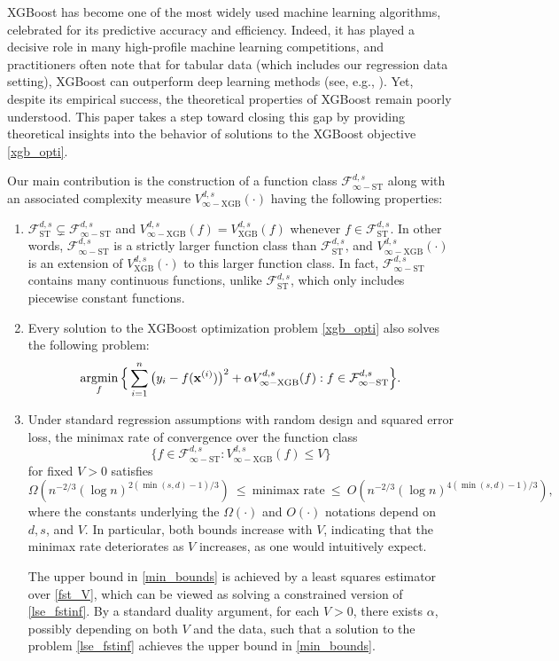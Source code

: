 \documentclass[10pt]{article}
\newcommand{\fst}{{\mathcal{F}^{d, s}_{\text{ST}}}}
\newcommand{\fstinf}{{\mathcal{F}^{d, s}_{\infty-\text{ST}}}}
\newcommand{\vxgb}{{V^{d, s}_{\text{XGB}}}}
\newcommand{\vinfxgb}{{V^{d, s}_{\infty-\text{XGB}}}}
\newcommand{\xbf}{{\mathbf{x}}}
\def\argmin{\mathop{\rm argmin}}
\begin{document}
XGBoost has become one of the most widely used machine learning
algorithms, celebrated for its predictive accuracy and efficiency. 
Indeed, it has played a decisive role in many high-profile machine 
learning competitions, and practitioners often note that for tabular 
data (which includes our regression data setting), XGBoost can 
outperform deep learning methods (see, e.g., 
\citet{shwartz2022tabular, grinsztajn2022tree, borisov2022deep}). 
Yet, despite its empirical success, the theoretical properties of 
XGBoost remain poorly understood. This paper takes a step toward 
closing this gap by providing theoretical insights into the behavior 
of solutions to the XGBoost objective \eqref{xgb_opti}.

Our main contribution is the construction of a function class
$\fstinf$ along with an associated complexity measure
$\vinfxgb(\cdot)$ having the following properties:
\begin{enumerate}
\item $\fst \subsetneq \fstinf$ and $\vinfxgb(f) = \vxgb(f)$ whenever
  $f \in \fst$. In other words, $\fstinf$ is a strictly larger 
  function class than $\fst$, and $\vinfxgb(\cdot)$ is an 
  extension of $\vxgb(\cdot)$ to this larger function class. In fact, 
  $\fstinf$ contains many continuous functions, unlike $\fst$, which 
  only includes piecewise constant functions.
\item Every solution to the XGBoost optimization problem
  \eqref{xgb_opti} also solves the following problem:
\begin{equation}\label{lse_fstinf}
    \argmin_f \Big\{\sum_{i=1}^n \big(y_i - f(\xbf^{(i)})\big)^2 
    + \alpha \vinfxgb(f): f \in \fstinf \Big\}.
\end{equation}
\item Under standard regression assumptions with random design and
  squared error loss, the minimax rate of convergence over the 
  function class 
\begin{equation}\label{fst_V}
    \big\{f \in \fstinf: \vinfxgb(f) \le V \big\}
\end{equation}
for fixed $V > 0$ satisfies
\begin{equation}\label{min_bounds}
    \Omega(n^{-2/3} (\log n)^{2(\min(s, d)-1)/3})
    ~ \le ~ \text{minimax rate} ~ \le ~
    O(n^{-2/3} (\log n)^{4(\min(s, d)-1)/3}),  
\end{equation}
where the constants underlying the $\Omega(\cdot)$ and $O(\cdot)$ 
notations depend on $d, s$, and $V$. In particular, both bounds 
increase with $V$, indicating that the minimax rate deteriorates as $V$ 
increases, as one would intuitively expect.

The upper bound in \eqref{min_bounds} is achieved by a least squares 
estimator over \eqref{fst_V}, which can be viewed as solving a 
constrained version of \eqref{lse_fstinf}. By a standard duality
argument, for each $V > 0$, there exists $\alpha$, possibly depending
on both $V$ and the data, such that a solution to the problem
\eqref{lse_fstinf} achieves the upper bound in
\eqref{min_bounds}. 
\end{enumerate}
\end{document}
